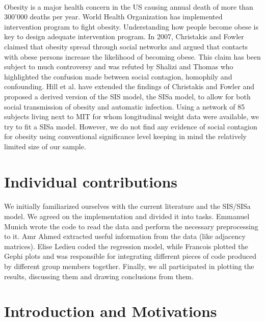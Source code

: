 \documentclass[11pt]{article}
\begin{document}
\paragraph{}
Obesity is a major health concern in the US causing annual death of more than 300'000 deaths per year. World Health Organization has implemented intervention program to fight obesity.  Understanding how people become obese is key to design adequate intervention program. In 2007, Christakis and Fowler claimed that obesity spread through social networks and argued that contacts with obese persons increase the likelihood of becoming obese. This claim has been subject to much controversy and was refuted by Shalizi and Thomas who highlighted the confusion made between social contagion, homophily and confounding.  Hill et al. have extended the findings of Christakis and Fowler and proposed a derived version of the SIS model, the SISa model, to allow for both social transmission of obesity and automatic infection. Using a network of 85 subjects living next to MIT for whom longitudinal weight data were available, we try to fit a SISa model. However, we do not find any evidence of social contagion for obesity using conventional significance level keeping in mind the relatively limited size of our sample.
\pagebreak

\section{Individual contributions}
\paragraph{}
We initially familiarized ourselves with the current literature and the SIS/SISa model. We agreed on the implementation and divided it into tasks. Emmanuel Munich wrote the code to read the data and perform the necessary preprocessing to it. Amr Ahmed extracted useful information from the data (like adjacency matrices). Elise Ledieu coded the regression model, while Francois plotted the Gephi plots and was responsible for integrating different pieces of code produced by different group members together. Finally, we all participated in plotting the results, discussing them and drawing conclusions from them.
\pagebreak

\section{Introduction and Motivations}
\end{document}
